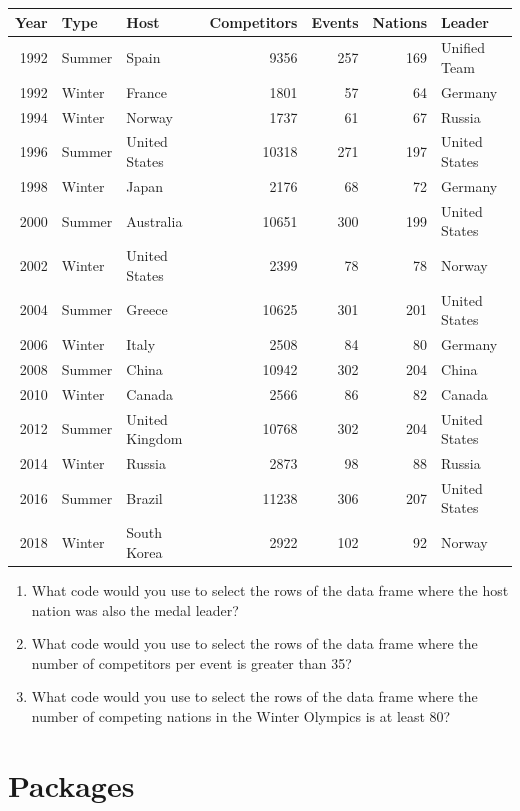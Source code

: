\documentclass[
]{book}
\providecommand{\tightlist}{%
  \setlength{\itemsep}{0pt}\setlength{\parskip}{0pt}}
\begin{document}
\begin{tabular}{r|l|l|r|r|r|l}
\hline
Year & Type & Host & Competitors & Events & Nations & Leader\\
\hline
1992 & Summer & Spain & 9356 & 257 & 169 & Unified Team\\
\hline
1992 & Winter & France & 1801 & 57 & 64 & Germany\\
\hline
1994 & Winter & Norway & 1737 & 61 & 67 & Russia\\
\hline
1996 & Summer & United States & 10318 & 271 & 197 & United States\\
\hline
1998 & Winter & Japan & 2176 & 68 & 72 & Germany\\
\hline
2000 & Summer & Australia & 10651 & 300 & 199 & United States\\
\hline
2002 & Winter & United States & 2399 & 78 & 78 & Norway\\
\hline
2004 & Summer & Greece & 10625 & 301 & 201 & United States\\
\hline
2006 & Winter & Italy & 2508 & 84 & 80 & Germany\\
\hline
2008 & Summer & China & 10942 & 302 & 204 & China\\
\hline
2010 & Winter & Canada & 2566 & 86 & 82 & Canada\\
\hline
2012 & Summer & United Kingdom & 10768 & 302 & 204 & United States\\
\hline
2014 & Winter & Russia & 2873 & 98 & 88 & Russia\\
\hline
2016 & Summer & Brazil & 11238 & 306 & 207 & United States\\
\hline
2018 & Winter & South Korea & 2922 & 102 & 92 & Norway\\
\hline
\end{tabular}

\begin{enumerate}
\def\labelenumi{\arabic{enumi}.}
\setcounter{enumi}{7}
\tightlist
\item
  What code would you use to select the rows of the data frame where the host nation was also the medal leader?
\item
  What code would you use to select the rows of the data frame where the number of competitors per event is greater than 35?
\item
  What code would you use to select the rows of the data frame where the number of competing nations in the Winter Olympics is at least 80?
\end{enumerate}

\hypertarget{packages}{%
\section{Packages}\label{packages}}
\end{document}
